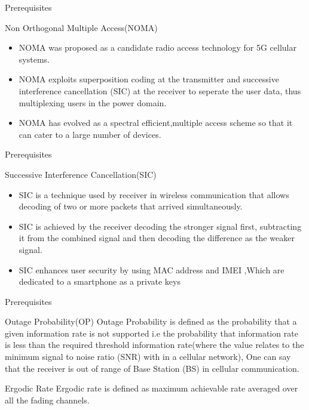 \documentclass{beamer}
\begin{document}
    \begin{frame}{Prerequisites}
    \begin{block}{Non Orthogonal Multiple Access(NOMA)}
    \begin{itemize}
        \item NOMA was proposed as a candidate radio access technology for 5G cellular systems.
        \item NOMA exploits superposition coding at the transmitter and successive interference cancellation (SIC) at the receiver to seperate the user data, thus multiplexing users in the power domain.
        \item NOMA has evolved as a spectral efficient,multiple access scheme so that it can cater to a large number of devices.
        \end{itemize}
    \end{block}
    \end{frame}
        \begin{frame}{Prerequisites}
      \begin{block}{Successive Interference Cancellation(SIC)}
            \begin{itemize} 
                 \item SIC is a technique used by receiver in wireless communication that allows decoding of two or more packets that arrived simultaneously.
        \item SIC is achieved by the receiver decoding the stronger signal first, subtracting it from the combined signal and then decoding the difference as the weaker signal.
        \item SIC enhances user security by using MAC address and IMEI ,Which are dedicated to a smartphone as a private keys
    \end{itemize}
    \end{block}
    \end{frame}
    \begin{frame}{Prerequisites}
    \begin{block}{Outage Probability(OP)}
       Outage Probability is defined as the probability that a given information rate is not supported i.e the probability that information rate is less than the required threshold information rate(where the value relates to the minimum signal to noise ratio (SNR) with in a cellular network), One can say that the receiver is out of range of Base Station (BS) in cellular communication.
    \end{block}
    \begin{block}{Ergodic Rate}
       Ergodic rate is defined as maximum achievable rate averaged over all the fading channels.
    \end{block}
\end{frame}
\end{document}
